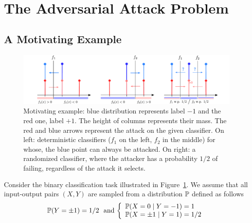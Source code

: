 
\section{The Adversarial Attack Problem}
\label{sec:adv-problem}
\subsection{A Motivating Example}
\label{sec:motiv-ex}

\begin{figure}[!ht]
    \centering
\includegraphics[width=\textwidth]{Images/Drawing-Intro-Mixte-Nash-on-a-line.pdf}   \caption{Motivating example: blue distribution represents label $-1$ and the red one, label $+1$.  The height of columns represents their mass. The red and blue arrows represent the attack on the given classifier. On left: deterministic classifiers ($f_1$ on the left, $f_2$ in the middle) for whose, the blue point can always be attacked. On right: a randomized classifier, where the attacker has a probability $1/2$ of failing, regardless of the attack it selects. }
    \label{fig:motivating_ex}
\end{figure}
Consider the binary classification task illustrated in Figure~\ref{fig:motivating_ex}. We assume that all input-output pairs $(X,Y)$ are sampled from a distribution $\mathbb{P}$ defined as follows
$$ 
\PP\left(Y =\pm 1\right)=1/2 \ \mbox{ and }\left\{
    \begin{array}{ll}
        \PP\left(X=0 \mid Y=-1\right) = 1 \\
        \PP\left(X= \pm 1 \mid Y=1\right) = 1/2 
    \end{array}
\right.
$$ 
